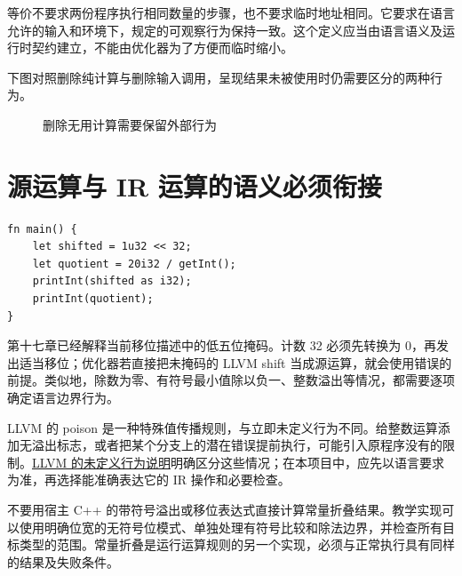 等价不要求两份程序执行相同数量的步骤，也不要求临时地址相同。它要求在语言允许的输入和环境下，规定的可观察行为保持一致。这个定义应当由语言语义及运行时契约建立，不能由优化器为了方便而临时缩小。

下图对照删除纯计算与删除输入调用，呈现结果未被使用时仍需要区分的两种行为。
\begin{figure}[htbp]\centering
{}
\caption{删除无用计算需要保留外部行为}
\end{figure}

\section{源运算与 IR 运算的语义必须衔接}
\begin{lstlisting}[language=Rustless,caption={边界值需要由语言规则解释}]
fn main() {
    let shifted = 1u32 << 32;
    let quotient = 20i32 / getInt();
    printInt(shifted as i32);
    printInt(quotient);
}
\end{lstlisting}
第十七章已经解释当前移位描述中的低五位掩码。计数 32 必须先转换为 0，再发出适当移位；优化器若直接把未掩码的 LLVM shift 当成源运算，就会使用错误的前提。类似地，除数为零、有符号最小值除以负一、整数溢出等情况，都需要逐项确定语言边界行为。

LLVM 的 poison 是一种特殊值传播规则，与立即未定义行为不同。给整数运算添加无溢出标志，或者把某个分支上的潜在错误提前执行，可能引入原程序没有的限制。\href{https://llvm.org/docs/UndefinedBehavior.html}{LLVM 的未定义行为说明}明确区分这些情况；在本项目中，应先以语言要求为准，再选择能准确表达它的 IR 操作和必要检查。

不要用宿主 C++ 的带符号溢出或移位表达式直接计算常量折叠结果。教学实现可以使用明确位宽的无符号位模式、单独处理有符号比较和除法边界，并检查所有目标类型的范围。常量折叠是运行运算规则的另一个实现，必须与正常执行具有同样的结果及失败条件。

